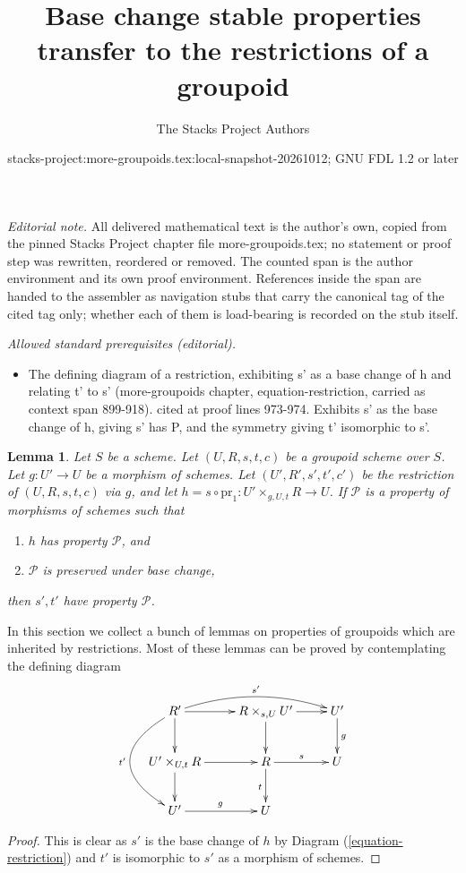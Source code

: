 \documentclass{stacks-project}
\title{Base change stable properties transfer to the restrictions of a groupoid}
\author{The Stacks Project Authors}
\date{stacks-project:more-groupoids.tex:local-snapshot-20261012; GNU FDL 1.2 or later}
\theoremstyle{plain}
\newtheorem{lemma}[subsection]{Lemma}
\theoremstyle{definition}
\theoremstyle{remark}
\numberwithin{equation}{subsection}
\begin{document}
\maketitle
\setcounter{subsection}{1}
\noindent\textit{Editorial note.} All delivered mathematical text is the author's own, copied from the pinned Stacks Project chapter file more-groupoids.tex; no statement or proof step was rewritten, reordered or removed. The counted span is the author environment and its own proof environment. References inside the span are handed to the assembler as navigation stubs that carry the canonical tag of the cited tag only; whether each of them is load-bearing is recorded on the stub itself.\par\medskip
\noindent\textit{Allowed standard prerequisites (editorial).}\begin{itemize}
\item The defining diagram of a restriction, exhibiting s' as a base change of h and relating t' to s' (more-groupoids chapter, equation-restriction, carried as context span 899-918). cited at proof lines 973-974. Exhibits s' as the base change of h, giving s' has P, and the symmetry giving t' isomorphic to s'.
\end{itemize}\medskip
\begin{lemma}
\label{lemma-restrict-property}
Let $S$ be a scheme.
Let $(U, R, s, t, c)$ be a groupoid scheme over $S$.
Let $g : U' \to U$ be a morphism of schemes.
Let $(U', R', s', t', c')$ be the restriction of
$(U, R, s, t, c)$ via $g$, and let
$h = s \circ \text{pr}_1 : U' \times_{g, U, t} R \to U$. If
$\mathcal{P}$ is a property of morphisms of schemes such that
\begin{enumerate}
\item $h$ has property $\mathcal{P}$, and
\item $\mathcal{P}$ is preserved under base change,
\end{enumerate}
then $s', t'$ have property $\mathcal{P}$.
\end{lemma}

\noindent
In this section we collect a bunch of lemmas on
properties of groupoids which are inherited by restrictions.
Most of these lemmas can be proved by contemplating the
defining diagram
\begin{equation}
\label{equation-restriction}
\vcenter{
\xymatrix{
R' \ar[d] \ar[r] \ar@/_3pc/[dd]_{t'} \ar@/^1pc/[rr]^{s'}&
R \times_{s, U} U' \ar[r] \ar[d] &
U' \ar[d]^g \\
U' \times_{U, t} R \ar[d] \ar[r] &
R \ar[r]^s \ar[d]_t &
U \\
U' \ar[r]^g &
U
}
}
\end{equation}

\begin{proof}
This is clear as $s'$ is the base change of $h$ by
Diagram (\ref{equation-restriction})
and $t'$ is isomorphic to $s'$ as a morphism of schemes.
\end{proof}
\end{document}
